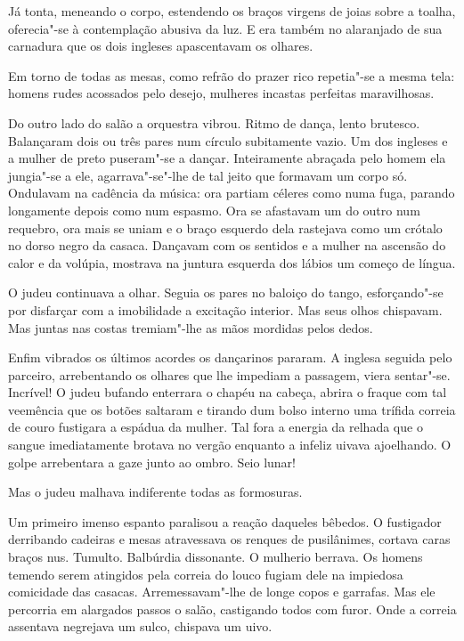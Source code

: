 \begin{linenumbers}
Já tonta, meneando o corpo, estendendo os braços virgens de joias sobre
a toalha, oferecia"-se à contemplação abusiva da luz. E era também no
alaranjado de sua carnadura que os dois ingleses apascentavam os
olhares.

Em torno de todas as mesas, como refrão do prazer rico repetia"-se a
mesma tela: homens rudes acossados pelo desejo, mulheres incastas
perfeitas maravilhosas.

Do outro lado do salão a orquestra vibrou. Ritmo de dança, lento
brutesco. Balançaram dois ou três pares num círculo subitamente vazio.
Um dos ingleses e a mulher de preto puseram"-se a dançar. Inteiramente
abraçada pelo homem ela jungia"-se a ele, agarrava"-se"-lhe de tal jeito
que formavam um corpo só. Ondulavam na cadência da música: ora partiam
céleres como numa fuga, parando longamente depois como num espasmo. Ora
se afastavam um do outro num requebro, ora mais se uniam e o braço
esquerdo dela rastejava como um crótalo no dorso negro da casaca.
Dançavam com os sentidos e a mulher na ascensão do calor e da volúpia,
mostrava na juntura esquerda dos lábios um começo de língua.

O judeu continuava a olhar. Seguia os pares no baloiço do tango,
esforçando"-se por disfarçar com a imobilidade a excitação interior. Mas
seus olhos chispavam. Mas juntas nas costas tremiam"-lhe as mãos mordidas
pelos dedos.

Enfim vibrados os últimos acordes os dançarinos pararam. A inglesa
seguida pelo parceiro, arrebentando os olhares que lhe impediam a
passagem, viera sentar"-se. Incrível! O judeu bufando enterrara o chapéu
na cabeça, abrira o fraque com tal veemência que os botões saltaram e
tirando dum bolso interno uma trífida correia de couro fustigara a
espádua da mulher. Tal fora a energia da relhada que o sangue
imediatamente brotava no vergão enquanto a infeliz uivava ajoelhando. O
golpe arrebentara a gaze junto ao ombro. Seio lunar!

Mas o judeu malhava indiferente todas as formosuras.

Um primeiro imenso espanto paralisou a reação daqueles bêbedos. O
fustigador derribando cadeiras e mesas atravessava os renques de
pusilânimes, cortava caras braços nus. Tumulto. Balbúrdia dissonante. O
mulherio berrava. Os homens temendo serem atingidos pela correia do
louco fugiam dele na impiedosa comicidade das casacas. Arremessavam"-lhe
de longe copos e garrafas. Mas ele percorria em alargados passos o
salão, castigando todos com furor. Onde a correia assentava negrejava um
sulco, chispava um uivo.


\end{linenumbers}

